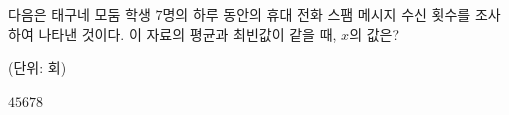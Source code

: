 다음은 태구네 모둠 학생 $7$명의 하루 동안의 휴대 전화 스팸 메시지 수신 횟수를 조사하여 나타낸 것이다. 이 자료의 평균과 최빈값이 같을 때, $x$의 값은?\par\noindent\hfill{\footnotesize (단위: 회)}
\begin{choices32}{$4$}{$5$}{$6$}{$7$}{$8$}\end{choices32}
